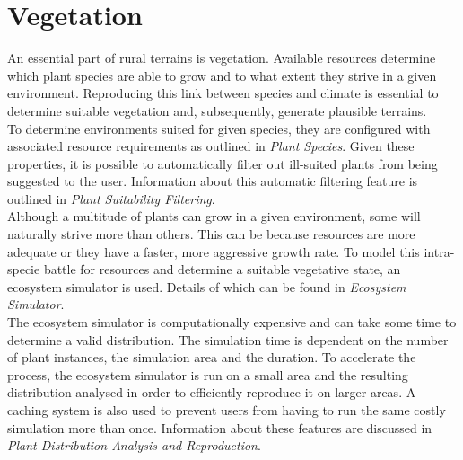 \chapter{Vegetation}

An essential part of rural terrains is vegetation. Available resources determine which plant species are able to grow and to what extent they strive in a given environment. Reproducing this link between species and climate is essential to determine suitable vegetation and, subsequently, generate plausible terrains. \\

To determine environments suited for given species, they are configured with associated resource requirements as outlined in \textit{Plant Species}. Given these properties, it is possible to automatically filter out ill-suited plants from being suggested to the user. Information about this automatic filtering feature is outlined in \textit{Plant Suitability Filtering}.\\

Although a multitude of plants can grow in a given environment, some will naturally strive more than others. This can be because resources are more adequate or they have a faster, more aggressive growth rate. To model this intra-specie battle for resources and  determine a suitable vegetative state, an ecosystem simulator is used. Details of which can be found in \textit{Ecosystem Simulator}.\\

The ecosystem simulator is computationally expensive and can take some time to determine a valid distribution. The simulation time is dependent on the number of plant instances, the simulation area and the duration. To accelerate the process, the ecosystem simulator is run on a small area and the resulting distribution analysed in order to efficiently reproduce it on larger areas. A caching system is also used to prevent users from having to run the same costly simulation more than once. Information about these features are discussed in \textit{Plant Distribution Analysis and Reproduction}.
